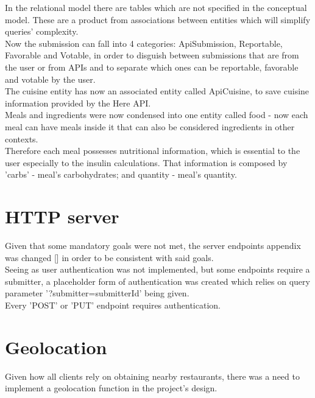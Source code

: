 In the relational model there are tables which are not specified in the conceptual model.
These are a product from associations between entities which will simplify queries' complexity.\\

Now the submission can fall into 4 categories: ApiSubmission, Reportable, Favorable and Votable, in order to disguish between submissions that
are from the user or from APIs and to separate which ones can be reportable, favorable and votable by the user.\\

The cuisine entity has now an associated entity called ApiCuisine, to save cuisine information provided by the Here API.\\

Meals and ingredients were now condensed into one entity called food - now each meal can have meals inside it that can also be considered
ingredients in other contexts.\\

Therefore each meal possesses nutritional information, which is essential to the user especially to the insulin calculations. That information is composed by
'carbs' - meal's carbohydrates; and quantity - meal's quantity.\\

\section{HTTP server}
Given that some mandatory goals were not met, the server endpoints appendix 
was changed [] in order to be consistent with said goals.\\

Seeing as user authentication was not implemented, but some endpoints require
a submitter, a placeholder form of authentication was created which relies on query parameter
'?submitter={submitterId}' being given.\\

Every 'POST' or 'PUT' endpoint requires authentication.\\

\section{Geolocation}

Given how all clients rely on obtaining nearby restaurants, there was a need to implement a geolocation function in the project's design.\\

